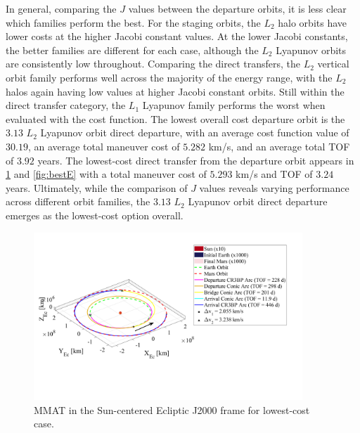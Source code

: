 In general, comparing the $J$ values between the departure orbits, it is less clear which families
perform the best. For the staging orbits, the $L_{2}$ halo orbits have lower costs at the higher
Jacobi constant values. At the lower Jacobi constants, the better families are different for each
case, although the $L_{2}$ Lyapunov orbits are consistently low throughout. Comparing the direct
transfers, the $L_{2}$ vertical orbit family performs well across the majority of the energy range,
with the $L_{2}$ halos again having low values at higher Jacobi constant orbits. Still within the
direct transfer category, the $L_{1}$ Lyapunov family performs the worst when evaluated with the
cost function. The lowest overall cost departure orbit is the $3.13$ $L_{2}$ Lyapunov orbit direct
departure, with an average cost function value of $30.19$, an average total maneuver cost of
$5.282$ km/s, and an average total TOF of $3.92$ years. The lowest-cost direct transfer from the
departure orbit appears in \cref{fig:bestMMAT} and \cref{fig:bestE} with a total maneuver cost of
$5.293$ km/s and TOF of $3.24$ years. Ultimately, while the comparison of $J$ values reveals
varying performance across different orbit families, the $3.13$ $L_{2}$ Lyapunov orbit direct
departure emerges as the lowest-cost option overall.
\vspace{20mm}

\begin{figure}[H]
    \centering
    \includegraphics[width=0.9\textwidth]{figures/BestMMAT.pdf}
    \caption{MMAT in the Sun-centered Ecliptic J2000 frame for lowest-cost case.}
    \label{fig:bestMMAT}
\end{figure}

